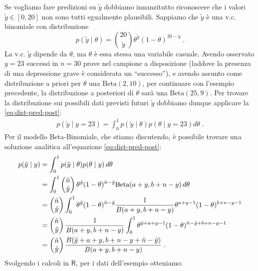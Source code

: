 \documentclass[
  11pt,
  italian,
  a4paper,
  extrafontsizes,onecolumn,openright
  ]{memoir}
\newcommand{\R}{\textsf{R}} %
\theoremstyle{definition}
\theoremstyle{definition}
\theoremstyle{definition}
\theoremstyle{definition}
\theoremstyle{remark}
\begin{document}
Se vogliamo fare predizioni su \(\tilde{y}\) dobbiamo innanzitutto riconoscere che i valori \(\tilde{y} \in [0, 20]\) non sono tutti egualmente plausibili. Sappiamo che \(\tilde{y}\) è una v.c. binomiale con distribuzione
\begin{equation}
p(\tilde{y}\mid \theta) = \binom{20}{\tilde{y}} \theta^{\tilde{y}}(1-\theta)^{20 - \tilde{y}} \; .
\label{eq:post-yprime}
\end{equation}
La v.c. \(\tilde{y}\) dipende da \(\theta\), ma \(\theta\) è essa stessa una variabile casuale. Avendo osservato \(y = 23\) successi in \(n = 30\) prove nel campione a disposizione (laddove la presenza di una depressione grave è considerata un ``successo''), e avendo assunto come distribuzione a priori per \(\theta\) una \(\mbox{Beta}(2, 10)\), per continuare con l'esempio precedente, la distribuzione a posteriori di \(\theta\) sarà una \(\mbox{Beta}(25, 9)\). Per trovare la distribuzione sui possibili dati previsti futuri \(\tilde{y}\) dobbiamo dunque applicare la \eqref{eq:dist-pred-post}:
\begin{align}
p(\tilde{y} \mid y = 23) = \int_0^1 p(\tilde{y} \mid \theta) p(\theta \mid y = 23) d\theta \; .
\label{eq:post-yprime-y17}
\end{align}
Per il modello Beta-Binomiale, che stiamo discutendo, è possibile trovare una soluzione analitica all'equazione \eqref{eq:dist-pred-post}:
\begin{align}
p(\tilde{y} \mid y) &= \int_0^1 p(\tilde{y} \mid \theta)
p(\theta \mid y)\, d\theta \notag\\
 &= \int_0^1 \begin{pmatrix}\tilde{n}\\\tilde{y}\end{pmatrix}
 \theta^{\tilde{y}}
(1-\theta)^{\tilde{n}-\tilde{y}} \mbox{Beta}(a+y,b+n-y) \, d\theta \notag\\
&= \begin{pmatrix}{\tilde{n}}\\\tilde{y}\end{pmatrix} \int_0^1 \theta^{\tilde{y}}
(1-\theta)^{\tilde{n}-\tilde{y}} \frac{1}{B(a+y, b+n-y)}\theta^{a+y-1}(1-\theta)^{b+n-y-1}\notag\\
&= \begin{pmatrix}{\tilde{n}}\\\tilde{y}\end{pmatrix} \frac{1}{B(a+y, b+n-y)}\int_0^1 \theta^{\tilde{y}+a+y-1}(1-\theta)^{\tilde{n}-\tilde{y}+b+n-y-1}\notag\\
&= \begin{pmatrix}{\tilde{n}}\\\tilde{y}\end{pmatrix} \frac{B(\tilde{y}+a+y,b+n-y+\tilde{n}-\tilde{y})}{B(a+y, b+n-y)} \; .
\label{eq:post-yprime-an-sol-betabin}
\end{align}
Svolgendo i calcoli in \(\R\), per i dati dell'esempio otteniamo:
\end{document}
